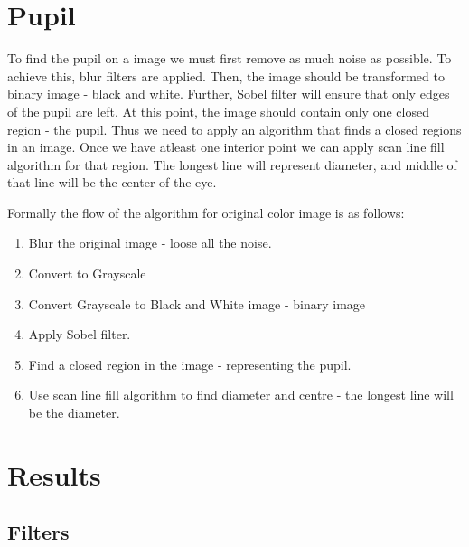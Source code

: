 \documentclass{article}
\begin{document}
\section{Pupil}
\label{sec:pupil}

To find the pupil on a image we must first remove as much noise as possible. To achieve this, blur filters are applied. Then, the image should be transformed to binary image - black and white. Further, Sobel filter will ensure that only edges of the pupil are left. At this point, the image should contain only one closed region - the pupil. Thus we need to apply an algorithm that finds a closed regions in an image. Once we have atleast one interior point we can apply scan line fill algorithm for that region. The longest line will represent diameter, and middle of that line will be the center of the eye.

Formally the flow of the algorithm for original color image is as follows:

\begin{enumerate}
	\item Blur the original image - loose all the noise.
	\item Convert to Grayscale
	\item Convert Grayscale to Black and White image - binary image
	\item Apply Sobel filter.
	\item Find a closed region in the image - representing the pupil.
	\item Use scan line fill algorithm to find diameter and centre - the longest line will be the diameter.
\end{enumerate}



\section{Results}
\label{sec:results}

\subsection{Filters}
\label{sec:results_filters}
\end{document}
